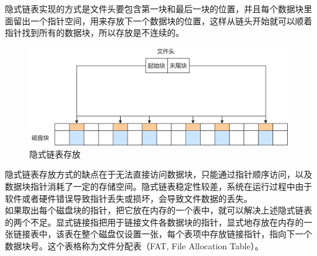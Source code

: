 隐式链表实现的方式是文件头要包含第一块和最后一块的位置，并且每个数据块里面留出一个指针空间，用来存放下一个数据块的位置，这样从链头开始就可以顺着指针找到所有的数据块，所以存放是不连续的。

\begin{figure}[H]
    \centering
    \includegraphics[scale=0.35]{img/C5/5-4/3.png}
    \caption{隐式链表存放}
\end{figure}

隐式链表存放方式的缺点在于无法直接访问数据块，只能通过指针顺序访问，以及数据块指针消耗了一定的存储空间。隐式链表稳定性较差，系统在运行过程中由于软件或者硬件错误导致指针丢失或损坏，会导致文件数据的丢失。\\

如果取出每个磁盘块的指针，把它放在内存的一个表中，就可以解决上述隐式链表的两个不足。显式链接指把用于链接文件各数据块的指针，显式地存放在内存的一张链接表中，该表在整个磁盘仅设置一张，每个表项中存放链接指针，指向下一个数据块号。这个表格称为文件分配表（FAT, File Allocation Table）。

